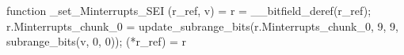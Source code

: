 function _set_Minterrupts_SEI (r_ref, v) = {
    r = __bitfield_deref(r_ref);
    r.Minterrupts_chunk_0 = update_subrange_bits(r.Minterrupts_chunk_0, 9, 9, subrange_bits(v, 0, 0));
    (*r_ref) = r
}

